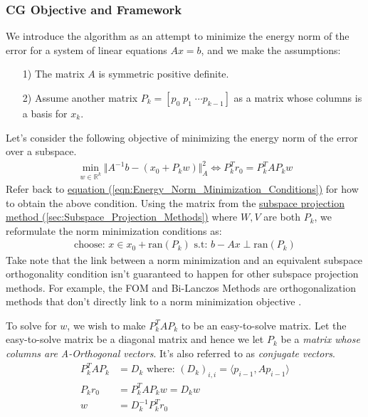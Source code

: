 \documentclass[]{article}
\theoremstyle{definition}
\begin{document}
        \subsubsection{CG Objective and Framework}
            We introduce the algorithm as an attempt to minimize the energy norm of the error for a system of linear equations $Ax = b$, and we make the assumptions: 
            \begin{itemize}
                \item [1)] The matrix $A$ is symmetric positive definite.  
                \item [2)] Assume another matrix $P_k = [p_0 \;p_1\;\cdots p_{k-1}]$ as a matrix whose columns is a basis for $x_k$.
            \end{itemize}
            Let's consider the following objective of minimizing the energy norm of the error over a subspace. 
            \begin{align}
                \min_{w \in \mathbb{R}^k}\Vert 
                    A^{-1}b - (x_0 + P_kw)
                \Vert_A^2 \iff P^T_kr_0 = P_k^TAP_kw
            \end{align}
            Refer back to \hyperref[eqn:Energy_Norm_Minimization_Conditions]{equation (\ref*{eqn:Energy_Norm_Minimization_Conditions})} for how to obtain the above condition. Using the matrix from the \hyperref[sec:Subspace_Projection_Methods]{subspace projection method (\ref*{sec:Subspace_Projection_Methods})} where $W, V$ are both $P_k$, we reformulate the norm minimization conditions as: 
            \begin{align}
                \text{choose: }x \in x_0 + \text{ran}(P_k) \text{ s.t: } b - Ax \perp \text{ran}(P_k)    
            \end{align}
            Take note that the link between a norm minimization and an equivalent subspace orthogonality condition isn't guaranteed to happen for other subspace projection methods. For example, the FOM and Bi-Lanczos Methods are orthogonalization methods that don't directly link to a norm minimization objective \cite{paper:FOM}. 
            \par
            To solve for $w$, we wish to make $P_k^TAP_k$ to be an easy-to-solve matrix. Let the easy-to-solve matrix be a diagonal matrix and hence we let $P_k$ be a \textit{matrix whose columns are A-Orthogonal vectors}. It's also referred to as \textit{conjugate vectors}. 
            \begin{align}
                P^T_kAP_k &= D_k \text{ where: } (D_k)_{i,i} = \langle p_{i - 1}, Ap_{i - 1}\rangle
                \\
                P_kr_0 &= P^T_kAP_kw = D_kw
                \\
                w &= D^{-1}_kP_k^Tr_0
            \end{align}
\end{document}
